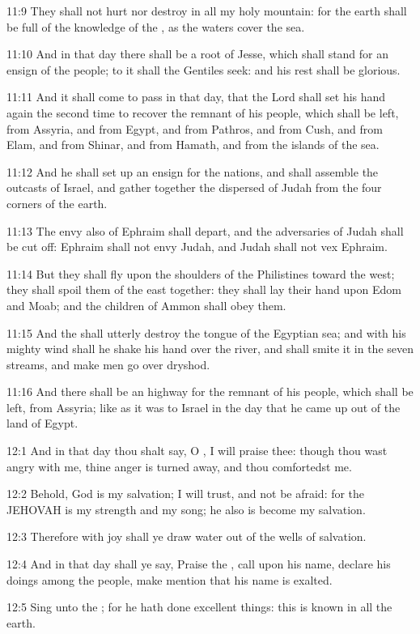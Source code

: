 11:9 They shall not hurt nor destroy in all my holy mountain: for the
earth shall be full of the knowledge of the \LORD, as the waters cover
the sea.

11:10 And in that day there shall be a root of Jesse, which shall
stand for an ensign of the people; to it shall the Gentiles seek: and
his rest shall be glorious.

11:11 And it shall come to pass in that day, that the Lord shall set
his hand again the second time to recover the remnant of his people,
which shall be left, from Assyria, and from Egypt, and from Pathros,
and from Cush, and from Elam, and from Shinar, and from Hamath, and
from the islands of the sea.

11:12 And he shall set up an ensign for the nations, and shall
assemble the outcasts of Israel, and gather together the dispersed of
Judah from the four corners of the earth.

11:13 The envy also of Ephraim shall depart, and the adversaries of
Judah shall be cut off: Ephraim shall not envy Judah, and Judah shall
not vex Ephraim.

11:14 But they shall fly upon the shoulders of the Philistines toward
the west; they shall spoil them of the east together: they shall lay
their hand upon Edom and Moab; and the children of Ammon shall obey
them.

11:15 And the \LORD shall utterly destroy the tongue of the Egyptian
sea; and with his mighty wind shall he shake his hand over the river,
and shall smite it in the seven streams, and make men go over dryshod.

11:16 And there shall be an highway for the remnant of his people,
which shall be left, from Assyria; like as it was to Israel in the day
that he came up out of the land of Egypt.

12:1 And in that day thou shalt say, O \LORD, I will praise thee:
though thou wast angry with me, thine anger is turned away, and thou
comfortedst me.

12:2 Behold, God is my salvation; I will trust, and not be afraid: for
the \LORD JEHOVAH is my strength and my song; he also is become my
salvation.

12:3 Therefore with joy shall ye draw water out of the wells of
salvation.

12:4 And in that day shall ye say, Praise the \LORD, call upon his
name, declare his doings among the people, make mention that his name
is exalted.

12:5 Sing unto the \LORD; for he hath done excellent things: this is
known in all the earth.

